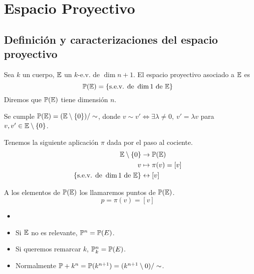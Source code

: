 \section{Espacio Proyectivo}

\subsection{Definición y caracterizaciones del espacio proyectivo}
    \begin{defi}
        Sea $k$ un cuerpo, $\mathbb{E}$ un $k$-e.v. de $\dim n+1$. El espacio proyectivo asociado a $\mathbb{E}$ es 
        \[\mathbb{P} (\mathbb{E}) = \left\{\text{s.e.v. de } \dim 1 \text{ de } \mathbb{E}\right\}\]
        Diremos que $\mathbb{P} (\mathbb{E})$ tiene dimensión $n$.
    \end{defi}
    \begin{obs}
        Se cumple $\mathbb{P} (\mathbb{E}) = (\mathbb{E} \setminus \left\{0\right\}) / \sim$, donde $v \sim v'  \iff \exists \lambda \neq 0, \ v' = \lambda v$ para
        $v, v' \in \mathbb{E} \setminus \left\{0\right\}$.
    \end{obs}
    \begin{defi}
        Tenemos la siguiente aplicación $\pi$ dada por el paso al cociente.
        \[
        \begin{aligned}
        \mathbb{E} \setminus \left\{0\right\} &\to \mathbb{P} (\mathbb{E})\\
        v &\mapsto \pi(v) = [v]\\
        \left\{\text{s.e.v. de } \dim 1 \text{ de } \mathbb{E}\right\} &\leftrightarrow [v]
        \end{aligned}
        \]
    \end{defi}
    \begin{defi}
        A los elementos de $\mathbb{P} (\mathbb{E})$ los llamaremos puntos de $\mathbb{P} (\mathbb{E})$.
        \[p = \pi(v) = [v]\]
    \end{defi}
    \begin{obs}
        \begin{itemize}
            \item[]
            \item Si $\mathbb{E}$ no es relevante, $\mathbb{P}^n = \mathbb{P} (E)$.
            \item Si queremos remarcar $k$, $\mathbb{P}_k^n = \mathbb{P} (E)$.
            \item Normalmente $\mathbb{P}+k^n = \mathbb{P}(k^{n+1}) = (k^{n+1} \setminus {0})/\sim$.
        \end{itemize}
    \end{obs}
